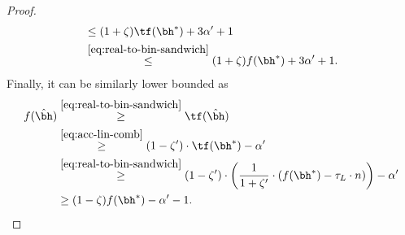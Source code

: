 \begin{proof}
\begin{align*}
&\leq (1 + \zeta) \tf(\bha) + 3\alpha' + 1 \\
&\overset{\eqref{eq:real-to-bin-sandwich}}{\leq} (1 + \zeta) f(\bha) + 3\alpha' + 1.
\end{align*}
Finally, it can be similarly lower bounded as
\begin{align*}
f(\hbh) &\overset{\eqref{eq:real-to-bin-sandwich}}{\geq}  \tf(\hbh) \\
&\overset{\eqref{eq:acc-lin-comb}}{\geq} (1 - \zeta') \cdot \tf(\bh^{\ast}) - \alpha' \\
&\overset{\eqref{eq:real-to-bin-sandwich}}{\geq} (1 - \zeta') \cdot \left(\frac{1}{1 + \zeta'} \cdot (f(\bh^{\ast}) - \tau_L \cdot n) \right) - \alpha' \\
&\geq (1 - \zeta) f(\bh^{\ast}) - \alpha' - 1. %
\end{align*}
\end{proof} 